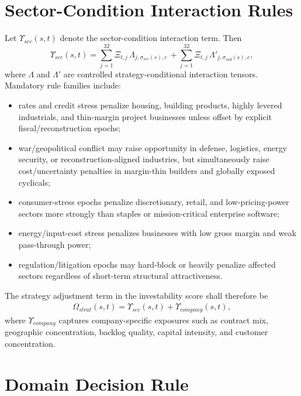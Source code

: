 \section{Sector-Condition Interaction Rules}

Let $\Upsilon_{sec}(s,t)$ denote the sector-condition interaction term. Then
\[
\Upsilon_{sec}(s,t)=\sum_{j=1}^{32}\Xi_{t,j}\,\Lambda_{j,\sigma_{sec}(s),c}\,+\sum_{j=1}^{32}\Xi_{t,j}\,\Lambda'_{j,\sigma_{ind}(s),c},
\]
where $\Lambda$ and $\Lambda'$ are controlled strategy-conditional interaction tensors. Mandatory rule families include:
\begin{itemize}
    \item rates and credit stress penalize housing, building products, highly levered industrials, and thin-margin project businesses unless offset by explicit fiscal/reconstruction epochs;
    \item war/geopolitical conflict may raise opportunity in defense, logistics, energy security, or reconstruction-aligned industries, but simultaneously raise cost/uncertainty penalties in margin-thin builders and globally exposed cyclicals;
    \item consumer-stress epochs penalize discretionary, retail, and low-pricing-power sectors more strongly than staples or mission-critical enterprise software;
    \item energy/input-cost stress penalizes businesses with low gross margin and weak pass-through power;
    \item regulation/litigation epochs may hard-block or heavily penalize affected sectors regardless of short-term structural attractiveness.
\end{itemize}
The strategy adjustment term in the investability score shall therefore be
\begin{align*}
\Omega_{strat}(s,t)=\Upsilon_{sec}(s,t)+\Upsilon_{company}(s,t),
\end{align*}
where $\Upsilon_{company}$ captures company-specific exposures such as contract mix, geographic concentration, backlog quality, capital intensity, and customer concentration.

\section{Domain Decision Rule}


